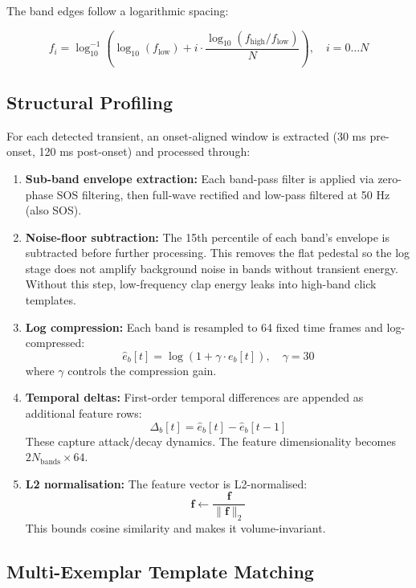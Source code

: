 \documentclass[12pt,a4paper]{article}
\begin{document}
The band edges follow a logarithmic spacing:

\[
f_i = \log_{10}^{-1}\left( \log_{10}(f_{\text{low}}) + i \cdot \frac{\log_{10}(f_{\text{high}} / f_{\text{low}})}{N} \right), \quad i = 0 \dots N
\]

\subsection{Structural Profiling}

For each detected transient, an onset-aligned window is extracted (30 ms pre-onset, 120 ms post-onset) and processed through:

\begin{enumerate}
    \item \textbf{Sub-band envelope extraction:} Each band-pass filter is applied via zero-phase SOS filtering, then full-wave rectified and low-pass filtered at 50 Hz (also SOS).

    \item \textbf{Noise-floor subtraction:} The 15th percentile of each band's envelope is subtracted before further processing. This removes the flat pedestal so the log stage does not amplify background noise in bands without transient energy. Without this step, low-frequency clap energy leaks into high-band click templates.

    \item \textbf{Log compression:} Each band is resampled to 64 fixed time frames and log-compressed:
    \[
    \hat{e}_b[t] = \log\left(1 + \gamma \cdot e_b[t]\right), \quad \gamma = 30
    \]
    where \(\gamma\) controls the compression gain.

    \item \textbf{Temporal deltas:} First-order temporal differences are appended as additional feature rows:
    \[
    \Delta_b[t] = \hat{e}_b[t] - \hat{e}_b[t-1]
    \]
    These capture attack/decay dynamics. The feature dimensionality becomes \(2N_{\text{bands}} \times 64\).

    \item \textbf{L2 normalisation:} The feature vector is L2-normalised:
    \[
    \mathbf{f} \leftarrow \frac{\mathbf{f}}{\|\mathbf{f}\|_2}
    \]
    This bounds cosine similarity and makes it volume-invariant.
\end{enumerate}

\subsection{Multi-Exemplar Template Matching}
\end{document}

